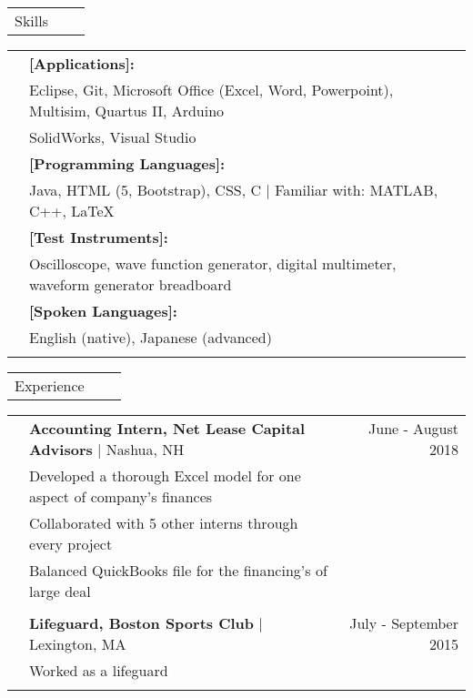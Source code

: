 \documentclass[letterpaper,10pt,oneside]{article}
\begin{document}
 \noindent \begin{tabularx}{\linewidth}{@{} l l R } 
     \Large{Skills}\\
 \end{tabularx}
 \noindent \begin{tabularx}{\linewidth}{@{} l l l }
     &\textbf{[Applications]:}\\
     &Eclipse, Git, Microsoft Office (Excel, Word, Powerpoint), Multisim, Quartus II, Arduino\\
     &SolidWorks, Visual Studio\\
     &\textbf{[Programming Languages]:}\\
     &Java, HTML (5, Bootstrap), CSS, C $\mid$ Familiar with: MATLAB, C++, \LaTeX  \\
     &\textbf{[Test Instruments]:}\\
     &Oscilloscope, wave function generator, digital multimeter, waveform generator breadboard\\
     &\textbf{[Spoken Languages]:}\\
     &English (native), Japanese (advanced) \\
     \\
 \end{tabularx}

 \noindent \begin{tabularx}{\linewidth}{@{} l l R }
     \Large{Experience}\\
 \end{tabularx}     
 \noindent \begin{tabularx}{\linewidth}{@{} l l R }     
     & \textbf{Accounting Intern, Net Lease Capital Advisors} $\mid$ Nashua, NH & June - August 2018 \\
     &Developed a thorough Excel model for one aspect of company's finances\\
     &Collaborated with 5 other interns through every project\\
     &Balanced QuickBooks file for the financing's of large deal\\
     & \\
     &\textbf{Lifeguard, Boston Sports Club} $\mid$ Lexington, MA & July - September 2015 \\
     &Worked as a lifeguard  \\
     \\
 \end{tabularx}     


\newpage

\end{document}
